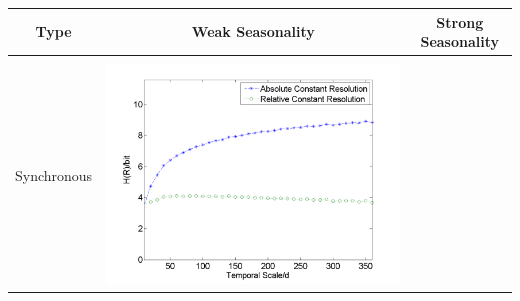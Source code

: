 \documentclass[review]{elsarticle}
\begin{document}
\begin{table}[H]\small
\resizebox{\textwidth}{!}
{
\label{EN}
\centering
\begin{tabular}{ccc}
\hline
Type& Weak Seasonality & Strong Seasonality \\\hline
\\
Synchronous
&\begin{minipage}{.6\textwidth}\includegraphics[width=\linewidth]{resultgraph/e05585000.png}\end{minipage}


\end{tabular}}
\end{table}
\end{document}
